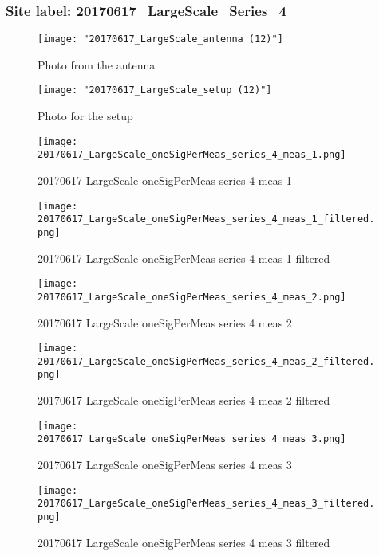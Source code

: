 \subsubsection{Site label: 20170617\_LargeScale\_Series\_4}
\begin{figure}[ht] \caption{Photo from the antenna}
\texttt{[image: "20170617\_LargeScale\_antenna (12)"]}\centering\end{figure}
\begin{figure}[ht] \caption{Photo for the setup}
\texttt{[image: "20170617\_LargeScale\_setup (12)"]}\centering\end{figure}
\begin{figure}[ht] \caption{20170617 LargeScale oneSigPerMeas series 4 meas 1}
\texttt{[image: 20170617\_LargeScale\_oneSigPerMeas\_series\_4\_meas\_1.png]}\centering\end{figure}
\begin{figure}[ht] \caption{20170617 LargeScale oneSigPerMeas series 4 meas 1 filtered}
\texttt{[image: 20170617\_LargeScale\_oneSigPerMeas\_series\_4\_meas\_1\_filtered.png]}\centering\end{figure}
\begin{figure}[ht] \caption{20170617 LargeScale oneSigPerMeas series 4 meas 2}
\texttt{[image: 20170617\_LargeScale\_oneSigPerMeas\_series\_4\_meas\_2.png]}\centering\end{figure}
\begin{figure}[ht] \caption{20170617 LargeScale oneSigPerMeas series 4 meas 2 filtered}
\texttt{[image: 20170617\_LargeScale\_oneSigPerMeas\_series\_4\_meas\_2\_filtered.png]}\centering\end{figure}
\begin{figure}[ht] \caption{20170617 LargeScale oneSigPerMeas series 4 meas 3}
\texttt{[image: 20170617\_LargeScale\_oneSigPerMeas\_series\_4\_meas\_3.png]}\centering\end{figure}
\begin{figure}[ht] \caption{20170617 LargeScale oneSigPerMeas series 4 meas 3 filtered}
\texttt{[image: 20170617\_LargeScale\_oneSigPerMeas\_series\_4\_meas\_3\_filtered.png]}\centering\end{figure}
\clearpage
